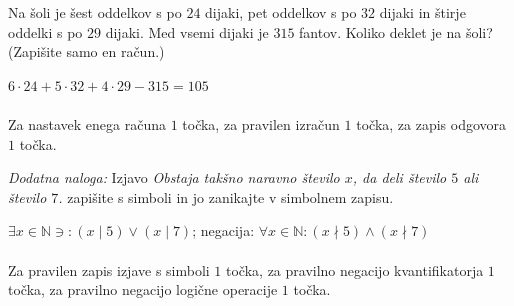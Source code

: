\documentclass[addpoints]{exam}
\begin{document}
\begin{questions}
        

    \question[3]
    Na šoli je šest oddelkov s po $24$ dijaki, pet oddelkov s po $32$ dijaki in štirje oddelki s po $29$ dijaki. 
    Med vsemi dijaki je $315$ fantov. Koliko deklet je na šoli? (Zapišite samo en račun.)

    \begin{solution}[7cm]
        $6\cdot 24+5\cdot 32+4\cdot 29-315=105$ \\ \\
        Za nastavek enega računa $1$ točka, za pravilen izračun $1$ točka, za zapis odgovora $1$ točka.
    \end{solution}

    
    \bonusquestion[3]
    \textit{Dodatna naloga:} Izjavo \textit{Obstaja takšno naravno število $x$, da deli število $5$ ali število $7$.} zapišite s simboli in jo zanikajte v simbolnem zapisu.
    
    \begin{solution}
        $\exists x\in\mathbb{N}\ni:(x\mid 5)\lor(x\mid 7)$; negacija: $\forall x\in\mathbb{N}: (x\nmid 5)\land(x\nmid 7)$ \\ \\
        Za pravilen zapis izjave s simboli $1$ točka, za pravilno negacijo kvantifikatorja $1$ točka, za pravilno negacijo logične operacije $1$ točka.
    \end{solution}

\end{questions}
\end{document}
